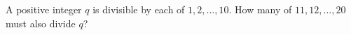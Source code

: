 A positive integer $q$ is divisible by each of $1,2,\dots,10$. How many of $11,12,\dots,20$ must also divide $q$?
